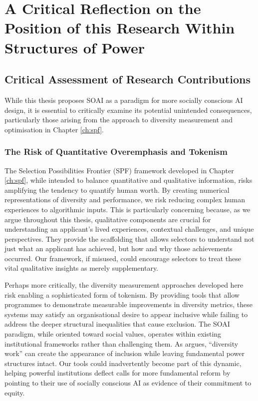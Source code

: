 \section{A Critical Reflection on the Position of this Research Within Structures of Power}\label{sec:reflexivity}

\subsection{Critical Assessment of Research Contributions}
While this thesis proposes SOAI as a paradigm for more socially conscious AI design, it is essential to critically examine its potential unintended consequences, particularly those arising from the approach to diversity measurement and optimisation in Chapter \ref{ch:spf}.

\subsubsection{The Risk of Quantitative Overemphasis and Tokenism}
The Selection Possibilities Frontier (SPF) framework developed in Chapter \ref{ch:spf}, while intended to balance quantitative and qualitative information, risks amplifying the tendency to quantify human worth. By creating numerical representations of diversity and performance, we risk reducing complex human experiences to algorithmic inputs. This is particularly concerning because, as we argue throughout this thesis, qualitative components are crucial for understanding an applicant's lived experiences, contextual challenges, and unique perspectives. They provide the scaffolding that allows selectors to understand not just what an applicant has achieved, but how and why those achievements occurred. Our framework, if misused, could encourage selectors to treat these vital qualitative insights as merely supplementary.

Perhaps more critically, the diversity measurement approaches developed here risk enabling a sophisticated form of tokenism. By providing tools that allow programmes to demonstrate measurable improvements in diversity metrics, these systems may satisfy an organisational desire to appear inclusive while failing to address the deeper structural inequalities that cause exclusion. The SOAI paradigm, while oriented toward social values, operates within existing institutional frameworks rather than challenging them. As \textcite{Ahmed_2012} argues, ``diversity work'' can create the appearance of inclusion while leaving fundamental power structures intact. Our tools could inadvertently become part of this dynamic, helping powerful institutions deflect calls for more fundamental reform by pointing to their use of socially conscious AI as evidence of their commitment to equity.

